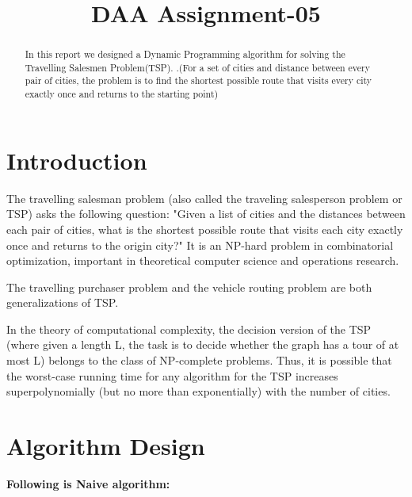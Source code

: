 \documentclass[conference]{IEEEtran}
\begin{document}
\title{DAA Assignment-05\\
}

\author{
\and
{}
\and
{}
}

\maketitle

\begin{abstract}
In this report we designed a Dynamic Programming algorithm for solving the Travelling Salesmen Problem(TSP).
.(For a set of cities and distance between every pair of cities, the problem is to find the shortest possible route that visits every city exactly once and returns to the starting point)
\end{abstract}

\section{Introduction}
The travelling salesman problem (also called the traveling salesperson problem or TSP) asks the following question: "Given a list of cities and the distances between each pair of cities, what is the shortest possible route that visits each city exactly once and returns to the origin city?" It is an NP-hard problem in combinatorial optimization, important in theoretical computer science and operations research.

The travelling purchaser problem and the vehicle routing problem are both generalizations of TSP.

In the theory of computational complexity, the decision version of the TSP (where given a length L, the task is to decide whether the graph has a tour of at most L) belongs to the class of NP-complete problems. Thus, it is possible that the worst-case running time for any algorithm for the TSP increases superpolynomially (but no more than exponentially) with the number of cities.
\section{Algorithm Design}

 \textbf{Following is Naive algorithm:}\\
\end{document}

